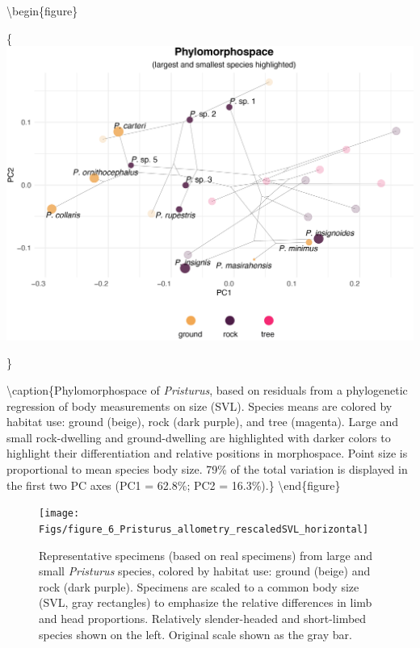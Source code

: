 \documentclass[
  11pt,
]{article}
\begin{document}
\newpage

\textbackslash begin\{figure\}

\{\centering \includegraphics[width=1\linewidth]{Figs/figure_5_phylomorphospace_large_small}

\}

\textbackslash caption\{Phylomorphospace of \textit{Pristurus}, based on
residuals from a phylogenetic regression of body measurements on size
(SVL). Species means are colored by habitat use: ground (beige), rock
(dark purple), and tree (magenta). Large and small rock-dwelling and
ground-dwelling are highlighted with darker colors to highlight their
differentiation and relative positions in morphospace. Point size is
proportional to mean species body size. 79\% of the total variation is
displayed in the first two PC axes (PC1 = 62.8\%; PC2 =
16.3\%).\}\label{fig:unnamed-chunk-8} \textbackslash end\{figure\}

\newpage

\begin{figure}

{\centering \texttt{[image: Figs/figure\_6\_Pristurus\_allometry\_rescaledSVL\_horizontal]} 

}

\caption{Representative specimens (based on real specimens) from large and small \textit{Pristurus} species, colored by habitat use: ground (beige) and rock (dark purple). Specimens are scaled to a common body size (SVL, gray rectangles) to emphasize the relative differences in limb and head proportions. Relatively slender-headed and short-limbed species shown on the left. Original scale shown as the gray bar.}\label{fig:unnamed-chunk-9}
\end{figure}
\end{document}
